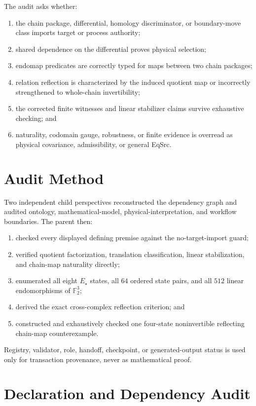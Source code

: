 \documentclass[11pt]{article}
\newcommand{\Ftwo}{\mathbb F_2}
\begin{document}
The audit asks whether:
\begin{enumerate}[leftmargin=*]
  \item the chain package, differential, homology discriminator, or
  boundary-move class imports target or process authority;
  \item shared dependence on the differential proves physical selection;
  \item endomap predicates are correctly typed for maps between two chain
  packages;
  \item relation reflection is characterized by the induced quotient map or
  incorrectly strengthened to whole-chain invertibility;
  \item the corrected finite witnesses and linear stabilizer claims survive
  exhaustive checking; and
  \item naturality, codomain gauge, robustness, or finite evidence is
  overread as physical covariance, admissibility, or general EqSrc.
\end{enumerate}

\section{Audit Method}

Two independent child perspectives reconstructed the dependency graph and
audited ontology, mathematical-model, physical-interpretation, and workflow
boundaries. The parent then:
\begin{enumerate}[leftmargin=*]
  \item checked every displayed defining premise against the no-target-import
  guard;
  \item verified quotient factorization, translation classification, linear
  stabilization, and chain-map naturality directly;
  \item enumerated all eight \(E_\star\) states, all \(64\) ordered state
  pairs, and all \(512\) linear endomorphisms of \(\Ftwo^3\);
  \item derived the exact cross-complex reflection criterion; and
  \item constructed and exhaustively checked one four-state noninvertible
  reflecting chain-map counterexample.
\end{enumerate}

Registry, validator, role, handoff, checkpoint, or generated-output status is
used only for transaction provenance, never as mathematical proof.

\section{Declaration and Dependency Audit}
\end{document}
